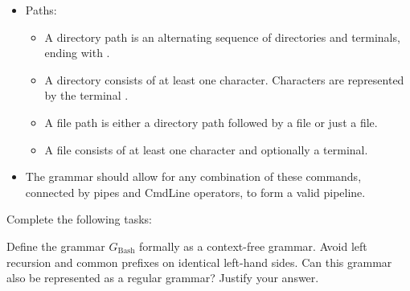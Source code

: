 \documentclass[10pt, a4paper]{article}
\begin{document}
\begin{itemize}
\begin{itemize}
        \item The  command requires a positive number of file paths as arguments.
    \end{itemize}
\item Paths:
    \begin{itemize}
        \item A directory path is an alternating sequence of directories and \terminal{/} terminals, ending with \terminal{/}.
        \item A directory consists of at least one character. Characters are represented by the terminal .
        \item A file path is either a directory path followed by a file or just a file.
        \item A file consists of at least one character and optionally a  terminal.
    \end{itemize}
    \item The grammar should allow for any combination of these commands, connected by pipes and CmdLine operators, to form a valid pipeline.
\end{itemize}

\vspace{0.2cm}
Complete the following tasks:
\begin{abcliste}  
    \abc Define the grammar $G_{\text{Bash}}$ formally as a context-free grammar. Avoid left recursion and common prefixes on identical left-hand sides.
    \abc Can this grammar also be represented as a regular grammar? Justify your answer.
\end{abcliste}  

\newpage
\end{document}
